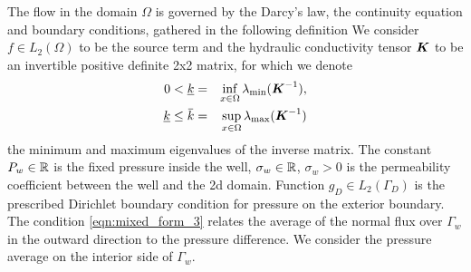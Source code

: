 
The flow in the domain $\Omega$ is governed by the Darcy's law, the continuity equation and
boundary conditions, gathered in the following definition
We consider $f\in L_2(\Omega)$ to be the source term and the hydraulic conductivity tensor $\mathbf{\boldsymbol{K}}$ to be an invertible
positive definite 2x2 matrix, for which we denote
\begin{eqnarray}
    0 < \underline{k} &=& \inf\limits_{x\in\Omega}\lambda_{\min}(\vc K^{-1}),\\
    \underline{k} \leq \overbar{k} &=& \sup\limits_{x\in\Omega}\lambda_{\max}(\vc K^{-1})
\end{eqnarray}
the minimum and maximum eigenvalues of the inverse matrix.
The constant $P_w\in\mathbb{R}$ is the fixed pressure inside the well, $\sigma_w\in\mathbb{R}$, $\sigma_w>0$ is the
permeability coefficient between the well and the 2d domain. Function $g_D\in L_2(\Gamma_D)$ is the 
prescribed Dirichlet boundary condition for pressure on the exterior boundary.
The condition \eqref{eqn:mixed_form_3} relates the average of the normal flux over $\Gamma_w$ in the outward direction
to the pressure difference. We consider the pressure average on the interior side of $\Gamma_w$.

